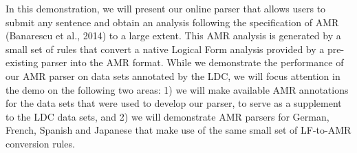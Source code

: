 In this demonstration, we will present our online parser that allows users to submit any sentence and obtain an analysis following the specification of AMR (Banarescu et al., 2014) to a large extent. This AMR analysis is generated by a small set of rules that convert a native Logical Form analysis provided by a pre-existing parser into the AMR format. While we demonstrate the performance of our AMR parser on data sets annotated by the LDC, we will focus attention in the demo on the following two areas: 1) we will make available AMR annotations for the data sets that were used to develop our parser, to serve as a supplement to the LDC data sets, and 2) we will demonstrate AMR parsers for German, French, Spanish and Japanese that make use of the same small set of LF-to-AMR conversion rules.
